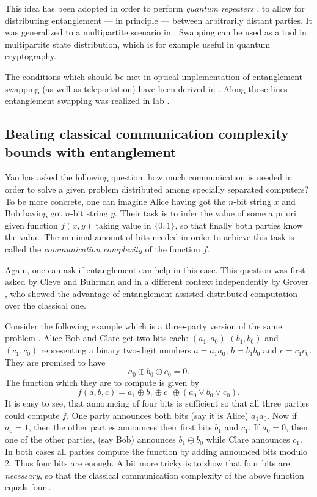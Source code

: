 \documentclass[twocolumn,aps,rmp]{revtex4}
\begin{document}
This idea has been adopted in order to perform {\it quantum repeaters}
\cite{repeaters}, to allow for distributing entanglement --- in
principle --- between arbitrarily distant parties. It was generalized
to a multipartite scenario in \cite{BoseWKt}.  Swapping can be used as
a tool in multipartite state distribution, which is for example useful
in quantum cryptography.

The conditions which should be met in optical implementation of
entanglement swapping (as well as teleportation) have been derived in
\cite{ent_swapping}. Along those lines entanglement swapping was
realized in lab \cite{exp_ent_swapping}.



\subsection{Beating classical communication complexity bounds with entanglement}
\label{subsec:Boundent}

Yao \cite{Yao_complexity} has asked the following question: how much
communication is needed in order to solve a given problem distributed
among specially separated computers? To be more concrete, one can
imagine Alice having got the $n$-bit string $x$ and Bob having got
$n$-bit string $y$. Their task is to infer the value of some a priori
given function $f(x,y)$ taking value in $\{0,1\}$, so that finally
both parties know the value. The minimal amount of bits needed in
order to achieve this task is called the {\it communication
  complexity} of the function $f$.

Again, one can ask if entanglement can help in this case. This
question was first asked by Cleve and Buhrman \cite{CBcom_cplx_1} and
in a different context independently by Grover \cite{Gcom_cplx_1}, who
showed the advantage of entanglement assisted distributed computation
over the classical one.

Consider the following example which is a three-party version of the
same problem \cite{BuhrmanCD1997-complexity}. Alice Bob and Clare get
two bits each: $(a_1,a_0)$ $(b_1,b_0)$ and $(c_1,c_0)$ representing a
binary two-digit numbers $a=a_1a_0$, $b=b_1b_0$ and $c=c_1c_0$. They
are promised to have
\begin{equation}
  a_0\oplus b_0 \oplus c_0 = 0.
 \label{eq:promise}
\end{equation}
The function which they are to compute is given by
\begin{equation}
f(a,b,c) = a_1\oplus b_1\oplus c_1\oplus (a_0 \vee b_0 \vee c_0).
\end{equation}
It is easy to see, that announcing of four bits is sufficient so that
all three parties could compute $f$. One party announces both bits
(say it is Alice) $a_1a_0$. Now if $a_0=1$, then the other parties
announces their first bits $b_1$ and $c_1$.  If $a_0=0$, then one of
the other parties, (say Bob) announces $b_1\oplus b_0$ while Clare
announces $c_1$. In both cases all parties compute the function by
adding announced bits modulo 2. Thus four bits are enough. A bit more
tricky is to show that four bits are {\it necessary}, so that the
classical communication complexity of the above function equals four
\cite{BuhrmanCD1997-complexity}.
\end{document}
